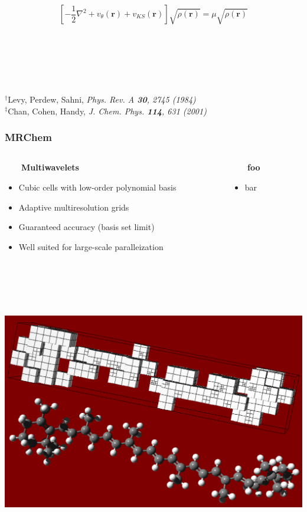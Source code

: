 \documentclass[mathserif, 8pt]{beamer}
\begin{document}
\begin{frame}
    \begin{equation}
        \nonumber
	\left[-\frac{1}{2}\nabla^2 + v_\theta(\boldsymbol{r}) + v_{KS}(\boldsymbol{r})\right]\sqrt{\rho(\boldsymbol{r})} = 
	\mu\sqrt{\rho(\boldsymbol{r})}
    \end{equation}
    \ \\
    \ \\
    \ \\
    \ \\
    \ \\
    \ \\
    $^\dag$\tiny{Levy, Perdew, Sahni, \it{Phys. Rev. A} \textbf{30}, 2745 (1984)}\\
    $^\ddag$\tiny{Chan, Cohen, Handy, \it{J. Chem. Phys.} \textbf{114}, 631 (2001)}
\end{frame}

\begin{frame}
    \frametitle{MRChem}
    \begin{columns}
    \begin{column}{.5\textwidth}
	\ \ \ \ \textbf{Multiwavelets}
	\begin{itemize}
	    \item   Cubic cells with low-order polynomial basis
	    \item   Adaptive multiresolution grids
	    \item   Guaranteed accuracy (basis set limit)
	    \item   Well suited for large-scale paralleization
	\end{itemize}
    \end{column}
    \begin{column}{.5\textwidth}
	\ \ \ \ \textbf{foo}
	\begin{itemize}
	    \item bar
	\end{itemize}
    \end{column}
    \end{columns}
    \ \\
    \ \\
    \ \\
    \ \\
    \centering
    \includegraphics[angle=0, scale=0.2]{figures/caroteneGrid.pdf}
\end{frame}
\end{document}
